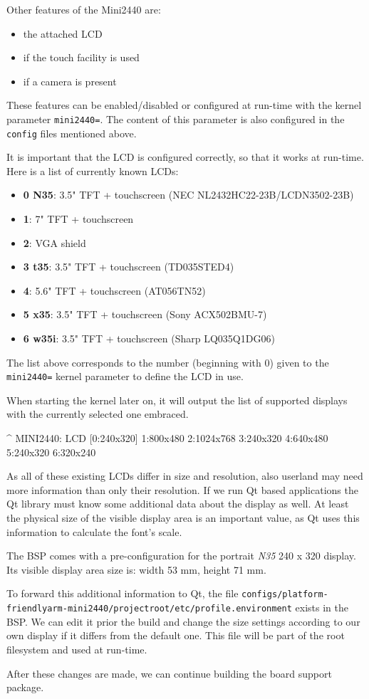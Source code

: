 Other features of the Mini2440 are:

\begin{itemize}
 \item the attached LCD
 \item if the touch facility is used
 \item if a camera is present
\end{itemize}

These features can be enabled/disabled or configured at run-time with the kernel
parameter \texttt{mini2440=}. The content of this parameter is also configured
in the \texttt{config} files mentioned above.

It is important that the LCD is configured correctly, so that it works at
run-time. Here is a list of currently known LCDs:

\begin{itemize}
 \item \textbf{0 N35}: 3.5" TFT + touchscreen (NEC NL2432HC22-23B/LCDN3502-23B)
 \item \textbf{1}: 7" TFT + touchscreen
 \item \textbf{2}: VGA shield
 \item \textbf{3 t35}: 3.5" TFT + touchscreen (TD035STED4)
 \item \textbf{4}: 5.6" TFT + touchscreen (AT056TN52)
 \item \textbf{5 x35}: 3.5" TFT + touchscreen (Sony ACX502BMU-7)
 \item \textbf{6 w35i}: 3.5" TFT + touchscreen (Sharp LQ035Q1DG06)
\end{itemize}

The list above corresponds to the number (beginning with 0) given to the
\texttt{mini2440=} kernel parameter to define the LCD in use.

When starting the kernel later on, it will output the list of supported displays
with the currently selected one embraced.

\begin{ptxshell}[escapechar=|]{^}
MINI2440: LCD [0:240x320] 1:800x480 2:1024x768 3:240x320 4:640x480 5:240x320 6:320x240
\end{ptxshell}

As all of these existing LCDs differ in size and resolution, also userland may
need more information than only their resolution. If we run Qt based applications
the Qt library must know some additional data about the display as well. At
least the physical size of the visible display area is an important value, as
Qt uses this information to calculate the font's scale.

The BSP comes with a pre-configuration for the portrait \textit{N35}
240 x 320 display. Its visible display area size is: width 53 mm, height 71 mm.

To forward this additional information to Qt, the file
\texttt{configs/platform-friendlyarm-mini2440/projectroot/etc/profile.environment}
exists in the BSP. We can edit it prior the build and change the size settings
according to our own display if it differs from the default one. This file will
be part of the root filesystem and used at run-time.

After these changes are made, we can continue building the board support
package.
